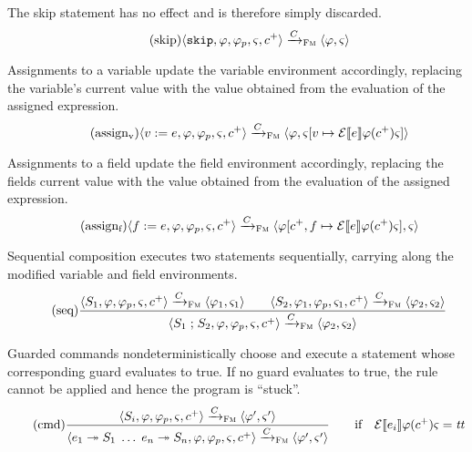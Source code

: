 \documentclass[a4paper,10pt,english]{article}
\begin{document}
The skip statement has no effect and is therefore simply discarded.
\begin{equation*}
	\tag{skip}
	\langle \mathtt{skip}, \varphi, \varphi_p, \varsigma, c^+ \rangle
		\xrightarrow{C}_\textsc{Fm}
	\langle \varphi, \varsigma \rangle
\end{equation*}

Assignments to a variable update the variable environment accordingly, replacing the variable's current value with the value
obtained from the evaluation of the assigned expression.
\begin{equation*}
	\tag{assign${}_\text{v}$}
	\configurationFm{\assignVarStm{\var}{\expr}, \fieldEnv, \fieldEnvOld, \varEnvFm, \toListNE{\comp}}
		\stmArrowFm
	\configurationFm{\fieldEnv, \varEnvFm[\var \mapsto \ExprSem{\expr} \fieldEnv(\toListNE{\comp}) \varEnvFm]}
\end{equation*}

Assignments to a field update the field environment accordingly, replacing the fields current value with the value
obtained from the evaluation of the assigned expression.
\begin{equation*}
	\tag{assign${}_\text{f}$}
	\configurationFm{\assignVarStm{\field}{\expr}, \fieldEnv, \fieldEnvOld, \varEnvFm, \toListNE{\comp}}
		\stmArrowFm
	\configurationFm{\fieldEnv[\toListNE{\comp}, \field \mapsto \ExprSem{\expr} \fieldEnv(\toListNE{\comp}) \varEnvFm], \varEnvFm}
\end{equation*}

Sequential composition executes two statements sequentially, carrying along the modified variable and field environments.
\begin{equation*}
	\tag{seq}
	\dfrac
	{
		\langle S_1, \varphi, \varphi_p, \varsigma, c^+ \rangle
			\xrightarrow{C}_\textsc{Fm}
		\langle \varphi_1, \varsigma_1 \rangle
		\qquad
		\langle S_2, \varphi_1, \varphi_p, \varsigma_1, c^+ \rangle
			\xrightarrow{C}_\textsc{Fm}
		\langle \varphi_2, \varsigma_2 \rangle
	}
	{
		\langle S_1 \; \mathtt{;} \; S_2, \varphi, \varphi_p, \varsigma, c^+ \rangle
			\xrightarrow{C}_\textsc{Fm}
		\langle \varphi_2, \varsigma_2 \rangle
	}
\end{equation*}

Guarded commands nondeterministically choose and execute a statement whose corresponding guard evaluates to true. If no guard
evaluates to true, the rule cannot be applied and hence the program is ``stuck''.
\begin{equation*}
	\tag{cmd}
	\dfrac
	{
		\langle S_i, \varphi, \varphi_p, \varsigma, c^+ \rangle
			\xrightarrow{C}_\textsc{Fm}
		\langle \varphi', \varsigma' \rangle
	}
	{
		\langle e_1 \; \mathtt{\twoheadrightarrow} \; S_1 \; \ldots \; e_n \; \mathtt{\twoheadrightarrow} \; S_n, \varphi, \varphi_p,
		\varsigma,
		c^+ \rangle
			\xrightarrow{C}_\textsc{Fm}
		\langle \varphi', \varsigma' \rangle
	}
	\qquad \text{if} \quad \mathcal{E} \llbracket e_i \rrbracket \varphi(c^+) \varsigma = \mathit{tt}
\end{equation*}
\end{document}
